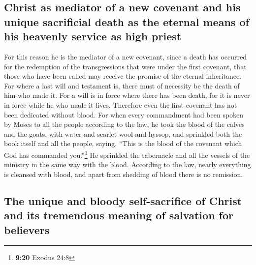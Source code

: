 \hypertarget{christ-as-mediator-of-a-new-covenant-and-his-unique-sacrificial-death-as-the-eternal-means-of-his-heavenly-service-as-high-priest}{%
\subsection{Christ as mediator of a new covenant and his unique
sacrificial death as the eternal means of his heavenly service as high
priest}\label{christ-as-mediator-of-a-new-covenant-and-his-unique-sacrificial-death-as-the-eternal-means-of-his-heavenly-service-as-high-priest}}

 For this reason he is the mediator of a new covenant,
since a death has occurred for the redemption of the transgressions that
were under the first covenant, that those who have been called may
receive the promise of the eternal inheritance.  For
where a last will and testament is, there must of necessity be the death
of him who made it.  For a will is in force where there
has been death, for it is never in force while he who made it lives.
 Therefore even the first covenant has not been dedicated
without blood.  For when every commandment had been
spoken by Moses to all the people according to the law, he took the
blood of the calves and the goats, with water and scarlet wool and
hyssop, and sprinkled both the book itself and all the people,
 saying, ``This is the blood of the covenant which God
has commanded you.''\footnote{\textbf{9:20} Exodus 24:8} 
He sprinkled the tabernacle and all the vessels of the ministry in the
same way with the blood.  According to the law, nearly
everything is cleansed with blood, and apart from shedding of blood
there is no remission.

\hypertarget{the-unique-and-bloody-self-sacrifice-of-christ-and-its-tremendous-meaning-of-salvation-for-believers}{%
\subsection{The unique and bloody self-sacrifice of Christ and its
tremendous meaning of salvation for
believers}\label{the-unique-and-bloody-self-sacrifice-of-christ-and-its-tremendous-meaning-of-salvation-for-believers}}

